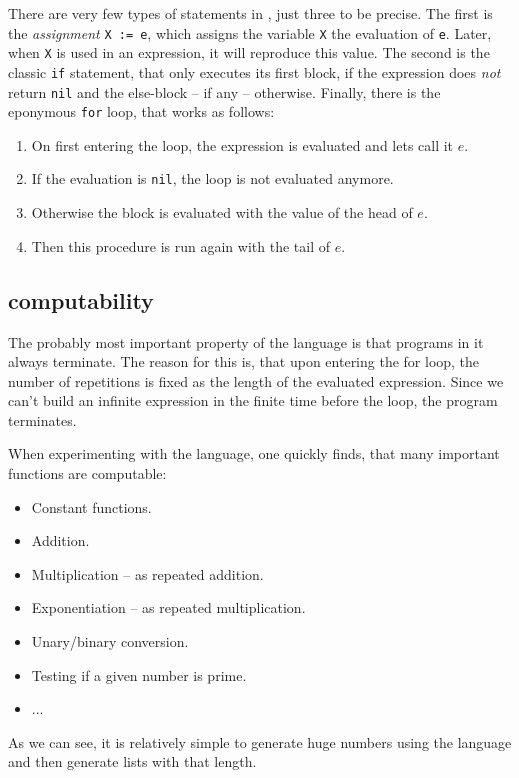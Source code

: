 There are very few types of statements in \FOR, just three to be precise. The 
first is the {\em assignment} {\tt X := e}, which assigns the variable {\tt X}
the evaluation of {\tt e}. Later, when {\tt X} is used in an expression, it 
will reproduce this value. The second is the classic {\tt if} statement, that 
only executes its first block, if the expression does {\em not} return {\tt nil} 
and the else-block -- if any -- otherwise. Finally, there is the eponymous 
{\tt for} loop, that works as follows:

\begin{enumerate}
	\item On first entering the loop, the expression is evaluated and lets call 
		it $e$.
	\item If the evaluation is {\tt nil}, the loop is not evaluated anymore.
	\item Otherwise the block is evaluated with the value of the head of $e$.
	\item Then this procedure is run again with the tail of $e$.
\end{enumerate}

\subsection{\FOR computability}
The probably most important property of the \FOR language is that programs in 
it always terminate. The reason for this is, that upon entering the for loop, 
the number of repetitions is fixed as the length of the evaluated expression. 
Since we can't build an infinite expression in the finite time before the 
loop, the program terminates.

When experimenting with the language, one quickly finds, that many important 
functions are \FOR computable:

\begin{itemize}
	\item Constant functions.
	\item Addition.
	\item Multiplication -- as repeated addition.
	\item Exponentiation -- as repeated multiplication.
	\item Unary/binary conversion.
	\item Testing if a given number is prime.
	\item ...
\end{itemize}

As we can see, it is relatively simple to generate huge numbers using the 
\FOR language and then generate lists with that length.

